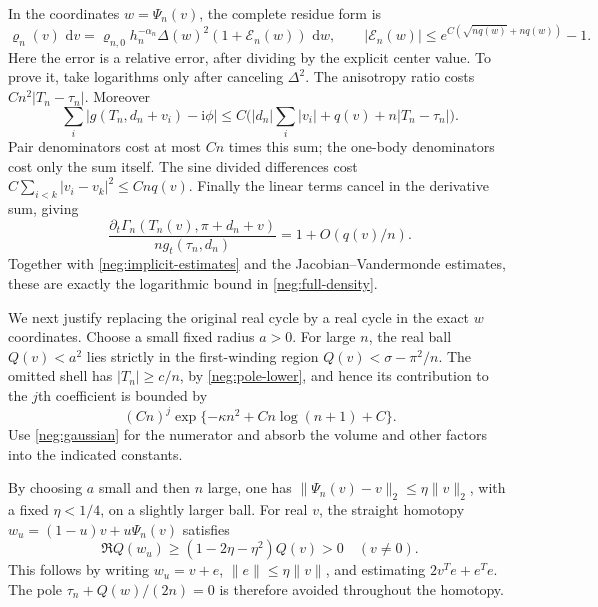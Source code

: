 \documentclass[11pt]{article}
\numberwithin{equation}{section}
\theoremstyle{definition}
\newcommand{\ii}{\mathrm i}
\newcommand{\dd}{\,\mathrm d}
\begin{document}
In the coordinates \(w=\Psi_n(v)\), the complete residue form is
\begin{equation}
 \varrho_n(v)\,\dd v
  =\varrho_{n,0}h_n^{-\alpha_n}
       \Delta(w)^2(1+\mathcal E_n(w))\,\dd w,
 \qquad
 |\mathcal E_n(w)|
 \le e^{C(\sqrt{nq(w)}+nq(w))}-1 .
 \label{neg:full-density}
\end{equation}
Here the error is a relative error, after dividing by the
explicit center value.  To prove it, take logarithms only
after canceling \(\Delta^2\).  The anisotropy ratio costs
\(Cn^2|T_n-\tau_n|\).  Moreover
\[
 \sum_i|g(T_n,d_n+v_i)-\ii\phi|
 \le C\bigl(|d_n|\sum_i|v_i|+q(v)
                                  +n|T_n-\tau_n|\bigr).
 \]
Pair denominators cost at most \(Cn\) times this sum;
the one-body denominators cost only the sum itself.
The sine divided differences cost
\(C\sum_{i<k}|v_i-v_k|^2\le Cnq(v)\).
Finally the linear terms cancel in the derivative sum, giving
\[
 \frac{\partial_t\Gamma_n(T_n(v),\pi+d_n+v)}
      {n g_t(\tau_n,d_n)}
      =1+O(q(v)/n).
 \]
Together with \eqref{neg:implicit-estimates} and the
Jacobian--Vandermonde estimates, these are exactly the
logarithmic bound in \eqref{neg:full-density}.

We next justify replacing the original real cycle by a real
cycle in the exact \(w\) coordinates.  Choose a small fixed
radius \(a>0\).  For large \(n\), the real ball \(Q(v)<a^2\)
lies strictly in the first-winding region
\(Q(v)<\sigma-\pi^2/n\).  The omitted shell has
\(|T_n|\ge c/n\), by \eqref{neg:pole-lower}, and hence its
contribution to the \(j\)th coefficient is bounded by
\[
 (Cn)^j\exp\{-\kappa n^2+C n\log(n+1)+C\}.
 \]
Use \eqref{neg:gaussian} for the numerator and absorb the
volume and other factors into the indicated constants.

By choosing \(a\) small and then \(n\) large, one has
\(\|\Psi_n(v)-v\|_2\le\eta\|v\|_2\), with a fixed
\(\eta<1/4\), on a slightly larger ball.  For real \(v\),
the straight homotopy
\(w_u=(1-u)v+u\Psi_n(v)\) satisfies
\begin{equation}
 \Re Q(w_u)\ge(1-2\eta-\eta^2)Q(v)>0
                    \quad(v\ne0).
 \label{neg:cycle-positivity}
\end{equation}
This follows by writing \(w_u=v+e\),
\(\|e\|\le\eta\|v\|\), and estimating
\(2v^Te+e^Te\).  The pole
\(\tau_n+Q(w)/(2n)=0\) is therefore avoided throughout
the homotopy.
\end{document}
